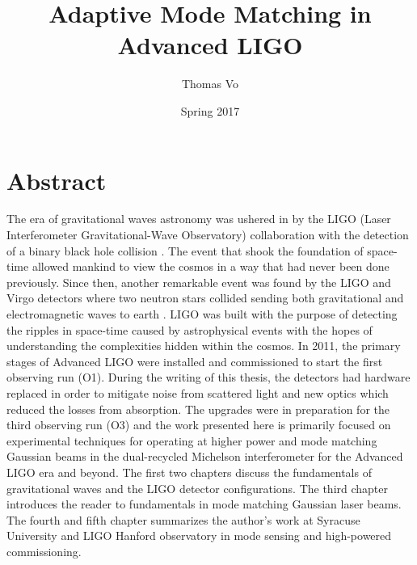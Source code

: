 \documentclass[oneside,12pt]{book}
\title{Adaptive Mode Matching in Advanced LIGO}
\date{Spring 2017}
\author{Thomas Vo}
\begin{document}
	
\doublespacing

	\chapter*{Abstract}
	The era of gravitational waves astronomy was ushered in by the LIGO (Laser Interferometer Gravitational-Wave Observatory) collaboration with the detection of a binary black hole collision \cite{DetectionPaper}.  The event that shook the foundation of space-time allowed mankind to view the cosmos in a way that had never been done previously. Since then, another remarkable event was found by the LIGO and Virgo detectors where two neutron stars collided sending both gravitational and electromagnetic waves to earth \cite{BNS}. LIGO was built with the purpose of detecting the ripples in space-time caused by astrophysical events with the hopes of understanding the complexities hidden within the cosmos.  In 2011, the primary stages of Advanced LIGO were installed and commissioned to start the first observing run (O1).  During the writing of this thesis, the detectors had hardware replaced in order to mitigate noise from scattered light and new optics which reduced the losses from absorption.  The upgrades were in preparation for the third observing run (O3) and the work presented here is primarily focused on experimental techniques for operating at higher power and mode matching Gaussian beams in the dual-recycled Michelson interferometer for the Advanced LIGO era and beyond.  The first two chapters discuss the fundamentals of gravitational waves and the LIGO detector configurations.  The third chapter introduces the reader to fundamentals in mode matching Gaussian laser beams.  The fourth and fifth chapter summarizes the author's work at Syracuse University and LIGO Hanford observatory in mode sensing and high-powered commissioning. 
	
	\maketitle
	
	\tableofcontents



	










\listoffigures
\listoftables

\medskip





	
\end{document}
